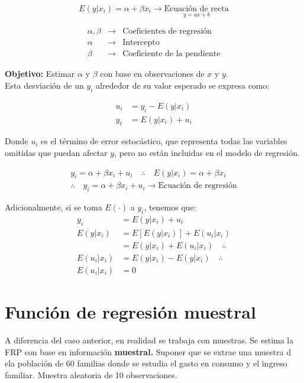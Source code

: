 \documentclass[
]{book}
\begin{document}
\[
E(y|x_i) = \alpha + \beta x_i \rightarrow \underset{y = ax+b}{\text{Ecuación de recta}}
\]

\[
\begin{array}{ccc} 
\alpha, \beta & \rightarrow & \text{Coeficientes de regresión} \\
\alpha & \rightarrow & \text{Intercepto} \\
\beta & \rightarrow & \text{Coeficiente de la pendiente}
\end{array}
\]

\textbf{Objetivo:} Estimar \(\alpha\) y \(\beta\) con base en observaciones de \(x\) y \(y\).\\
Esta desviación de un \(y_i\) alrededor de su valor esperado se expresa como:

\[
\begin{aligned}
u_i &= y_i - E(y|x_i) \\
y_i &= E(y|x_i) + u_i
\end{aligned}
\]

Donde \(u_i\) es el término de error estocástico, que representa todas las variables omitidas que puedan afectar \(y\), pero no están incluidas en el modelo de regresión.

\[
\begin{aligned}
y_i = \alpha + \beta x_i + u_i \quad \therefore \quad E(y|x_i) = \alpha + \beta x_i \\
\therefore \quad y_i = \alpha + \beta x_i + u_i \rightarrow \text{Ecuación de regresión}
\end{aligned}
\]

Adicionalmente, si se toma \(E(\cdot)\) a \(y_i\), tenemos que:
\[
\begin{aligned}
y_i &= E(y|x_i) + u_i \\
E(y|x_i) &= E[E(y|x_i)] + E(u_i|x_i) \\
&= E(y|x_i) + E(u_i|x_i) \quad \therefore \\
E(u_i|x_i) &= E(y|x_i) - E(y|x_i) \quad \therefore \\
E(u_i|x_i) &= 0
\end{aligned}
\]

\hypertarget{funciuxf3n-de-regresiuxf3n-muestral}{%
\section{Función de regresión muestral}\label{funciuxf3n-de-regresiuxf3n-muestral}}

A diferencia del caso anterior, en realidad se trabaja con muestras. Se estima la FRP con base en información \textbf{muestral.}
Suponer que se extrae una muestra d ela población de 60 familias donde se estudia el gasto en consumo y el ingreso familiar.
Muestra aleatoria de 10 observaciones.
\end{document}
